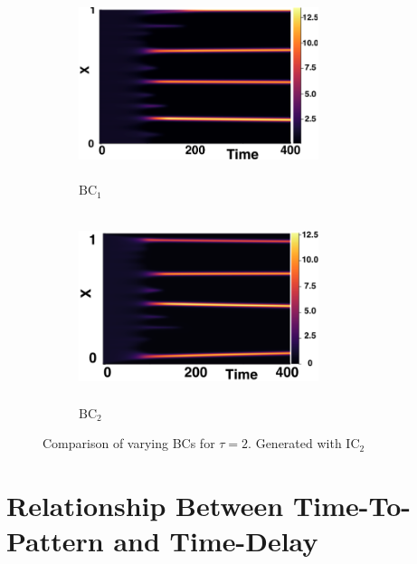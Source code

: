 \documentclass[12pt]{report}
\begin{document}
\begin{figure}[H]
    \centering
    \begin{subfigure}[b]{0.45\textwidth}
        \centering
        \includegraphics[width=7cm,height=5.5cm]{ic22.png}
        \caption{$\text{BC}_1$}
        \label{}
    \end{subfigure}
    \hfill
    \begin{subfigure}[b]{0.45\textwidth}
        \centering
        \includegraphics[width=7cm,height=5.5cm]{bc2.png}
        \caption{$\text{BC}_2$}
        \label{}
    \end{subfigure}
    \caption{Comparison of varying BCs for $\tau=2$. Generated with $\text{IC}_2$}
    \label{fig:bctau3}
\end{figure}

\section{Relationship Between Time-To-Pattern and Time-Delay}\label{section:delaypatt}
\end{document}
